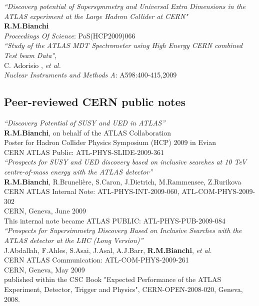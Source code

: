 \documentclass[10pt, a4paper]{article}
\begin{document}
\textit{``Discovery potential of Supersymmetry and Universal Extra Dimensions in the ATLAS experiment at the Large Hadron Collider at CERN"}\\
\textbf {R.M.Bianchi}\\
\emph{Proceedings Of Science}:   PoS(HCP2009)066\\

\textit{``Study of the ATLAS MDT Spectrometer using High Energy CERN combined Test beam Data"},\\
C. Adorisio , \textit{et al.}\\
\emph{Nuclear Instruments and Methods A}: A598:400-415,2009\\



\subsection{Peer-reviewed CERN public notes}

\textit{``Discovery Potential of SUSY and UED in ATLAS''}\\
\textbf{ R.M.Bianchi},  on behalf of the ATLAS Collaboration\\
Poster for Hadron Collider Physics Symposium (HCP) 2009 in Evian\\
CERN ATLAS Public:    ATL-PHYS-SLIDE-2009-361\\

\textit{``Prospects for SUSY and UED discovery based on inclusive searches at 10 TeV centre-of-mass energy with the ATLAS detector''}\\
\textbf{R.M.Bianchi}, R.Brunelière, S.Caron, J.Dietrich, M.Rammensee, Z.Rurikova\\
CERN ATLAS Internal Note:      ATL-PHYS-INT-2009-060, ATL-COM-PHYS-2009-302\\
CERN, Geneva, June 2009\\
This internal note became ATLAS PUBLIC:    ATL-PHYS-PUB-2009-084\\

\textit{``Prospects for Supersimmetry Discovery Based on Inclusive Searches with the ATLAS detector at the LHC (Long Version)''}\\
J.Abdallah, F.Ahles, S.Asai, J.Asal, A.J.Barr, \textbf{R.M.Bianchi},  \textit{et al.}\\
CERN ATLAS Communication: ATL-COM-PHYS-2009-261\\
CERN, Geneva, May 2009\\
published within the CSC Book "Expected Performance of the ATLAS Experiment, Detector, Trigger and Physics", CERN-OPEN-2008-020, Geneva, 2008.\\
\end{document}
